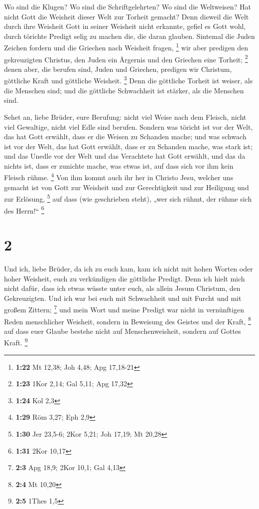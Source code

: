  Wo sind die Klugen? Wo sind die Schriftgelehrten? Wo sind
die Weltweisen? Hat nicht Gott die Weisheit dieser Welt zur Torheit
gemacht?  Denn dieweil die Welt durch ihre Weisheit Gott in
seiner Weisheit nicht erkannte, gefiel es Gott wohl, durch törichte
Predigt selig zu machen die, die daran glauben.  Sintemal
die Juden Zeichen fordern und die Griechen nach Weisheit fragen,
\footnote{\textbf{1:22} Mt 12,38; Joh 4,48; Apg 17,18-21} 
wir aber predigen den gekreuzigten Christus, den Juden ein Ärgernis und
den Griechen eine Torheit; \footnote{\textbf{1:23} 1Kor 2,14; Gal 5,11;
  Apg 17,32}  denen aber, die berufen sind, Juden und
Griechen, predigen wir Christum, göttliche Kraft und göttliche Weisheit.
\footnote{\textbf{1:24} Kol 2,3}  Denn die göttliche
Torheit ist weiser, als die Menschen sind; und die göttliche Schwachheit
ist stärker, als die Menschen sind.

 Sehet an, liebe Brüder, eure Berufung: nicht viel Weise
nach dem Fleisch, nicht viel Gewaltige, nicht viel Edle sind berufen.
 Sondern was töricht ist vor der Welt, das hat Gott
erwählt, dass er die Weisen zu Schanden mache; und was schwach ist vor
der Welt, das hat Gott erwählt, dass er zu Schanden mache, was stark
ist;  und das Unedle vor der Welt und das Verachtete hat
Gott erwählt, und das da nichts ist, dass er zunichte mache, was etwas
ist,  auf dass sich vor ihm kein Fleisch rühme. \footnote{\textbf{1:29}
  Röm 3,27; Eph 2,9}  Von ihm kommt auch ihr her in Christo
Jesu, welcher uns gemacht ist von Gott zur Weisheit und zur
Gerechtigkeit und zur Heiligung und zur Erlösung, \footnote{\textbf{1:30}
  Jer 23,5-6; 2Kor 5,21; Joh 17,19; Mt 20,28}  auf dass
(wie geschrieben steht), „wer sich rühmt, der rühme sich des Herrn!{}``
\footnote{\textbf{1:31} 2Kor 10,17}

\hypertarget{section-1}{%
\section{2}\label{section-1}}

 Und ich, liebe Brüder, da ich zu euch kam, kam ich nicht
mit hohen Worten oder hoher Weisheit, euch zu verkündigen die göttliche
Predigt.  Denn ich hielt mich nicht dafür, dass ich etwas
wüsste unter euch, als allein Jesum Christum, den Gekreuzigten.
 Und ich war bei euch mit Schwachheit und mit Furcht und mit
großem Zittern; \footnote{\textbf{2:3} Apg 18,9; 2Kor 10,1; Gal 4,13}
 und mein Wort und meine Predigt war nicht in vernünftigen
Reden menschlicher Weisheit, sondern in Beweisung des Geistes und der
Kraft, \footnote{\textbf{2:4} Mt 10,20}  auf dass euer
Glaube bestehe nicht auf Menschenweisheit, sondern auf Gottes Kraft.
\footnote{\textbf{2:5} 1Thes 1,5}

